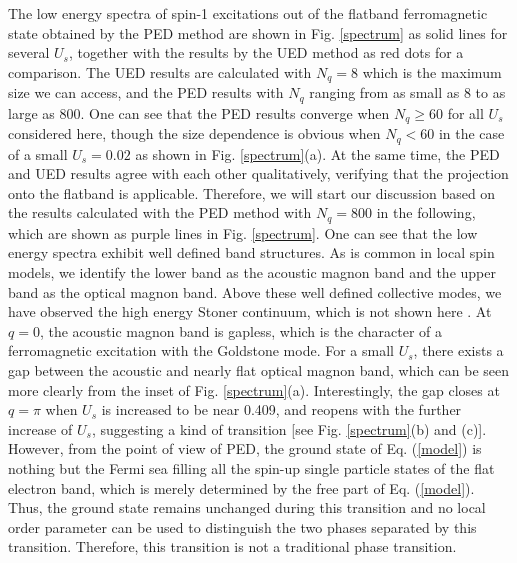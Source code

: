 \documentclass[amsmath,superscriptaddress,showpacs,aps,prb,twocolumn]{revtex4-1}
\begin{document}
\par The low energy spectra of spin-1 excitations out of the flatband ferromagnetic state obtained by the PED method are shown in Fig. \ref{spectrum} as solid lines for several $U_{s}$, together with the results by the UED method as red dots for a comparison. The UED results are calculated with $N_q=8$ which is the maximum size we can access, and the PED results with $N_q$ ranging from as small as $8$ to as large as $800$. One can see that the PED results converge when $N_q\ge 60$ for all $U_s$ considered here, though the size dependence is obvious when $N_q< 60$ in the case of a small $U_s=0.02$ as shown in Fig. \ref{spectrum}(a). At the same time, the PED and UED results agree with each other qualitatively, verifying that the projection onto the flatband is applicable. Therefore, we will start our discussion based on the results calculated with the PED method with $N_q=800$ in the following, which are shown as purple lines in Fig. \ref{spectrum}. One can see that the low energy spectra exhibit well defined band structures. As is common in local spin models, we identify the lower band as the acoustic magnon band and the upper band as the optical magnon band. Above these well defined collective modes, we have observed the high energy Stoner continuum, which is not shown here \cite{KA_PRL1994}. At $q=0$, the acoustic magnon band is gapless, which is the character of a ferromagnetic excitation with the Goldstone mode. For a small $U_s$, there exists a gap between the acoustic and nearly flat optical magnon band, which can be seen more clearly from the inset of Fig. \ref{spectrum}(a). Interestingly, the gap closes at $q=\pi$ when $U_s$ is increased to be near 0.409, and reopens with the further increase of $U_s$, suggesting a kind of transition [see Fig. \ref{spectrum}(b) and (c)]. However, from the point of view of PED, the ground state of Eq. (\ref{model}) is nothing but the Fermi sea filling all the spin-up single particle states of the flat electron band, which is merely determined by the free part of Eq. (\ref{model}). Thus, the ground state remains unchanged during this transition and no local order parameter can be used to distinguish the two phases separated by this transition. Therefore, this transition is not a traditional phase transition.
\end{document}
